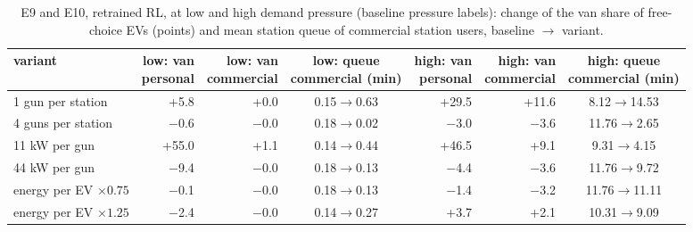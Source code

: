 \begin{table}[H]\centering
\scriptsize
\caption{E9 and E10, retrained RL, at low and high demand pressure (baseline pressure labels): change of the van share of free-choice EVs (points) and mean station queue of commercial station users, baseline $\to$ variant.}\label{tab:pressrl}
\begin{adjustbox}{max width=\textwidth}\begin{tabular}{lrrcrrc}\toprule
variant & \shortstack{low: van\\personal} & \shortstack{low: van\\commercial} & \shortstack{low: queue\\commercial (min)} & \shortstack{high: van\\personal} & \shortstack{high: van\\commercial} & \shortstack{high: queue\\commercial (min)} \\ \midrule
1 gun per station & +5.8 & +0.0 & 0.15$\to$0.63 & +29.5 & +11.6 & 8.12$\to$14.53 \\
4 guns per station & $-$0.6 & $-$0.0 & 0.18$\to$0.02 & $-$3.0 & $-$3.6 & 11.76$\to$2.65 \\
11 kW per gun & +55.0 & +1.1 & 0.14$\to$0.44 & +46.5 & +9.1 & 9.31$\to$4.15 \\
44 kW per gun & $-$9.4 & $-$0.0 & 0.18$\to$0.13 & $-$4.4 & $-$3.6 & 11.76$\to$9.72 \\
energy per EV $\times0.75$ & $-$0.1 & $-$0.0 & 0.18$\to$0.13 & $-$1.4 & $-$3.2 & 11.76$\to$11.11 \\
energy per EV $\times1.25$ & $-$2.4 & $-$0.0 & 0.14$\to$0.27 & +3.7 & +2.1 & 10.31$\to$9.09 \\
\bottomrule\end{tabular}\end{adjustbox}\end{table}
